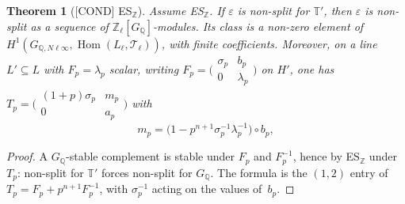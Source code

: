 \documentclass[11pt]{article}
\newcommand{\Z}{\mathbb{Z}}
\newcommand{\Q}{\mathbb{Q}}
\newcommand{\PGCOND}{\textsf{\small[COND]}}
\newtheorem*{theorem*}{Theorem}
\newcommand{\Hom}{\operatorname{Hom}}
\newcommand{\smat}[4]{\bigl(\begin{smallmatrix}#1&#2\\#3&#4\end{smallmatrix}\bigr)}
\begin{document}
\begin{theorem*}[\PGCOND{} ES$_{\Z}$] Assume \textup{ES$_{\Z}$}. If $\varepsilon$ is non-split for $\mathbb T'$, then $\varepsilon$ is non-split as a sequence of $\Z_\ell[G_\Q]$-modules. Its class is a non-zero element of $H^{1}(G_{\Q,N\ell\infty},\Hom(L_\ell,\mathcal T_\ell))$, with finite coefficients. Moreover, on a line $L'\subseteq L$ with $F_p=\lambda_p$ scalar, writing $F_p=\smat{\sigma_p}{b_p}{0}{\lambda_p}$ on $H'$, one has $T_p=\smat{(1+p)\sigma_p}{m_p}{0}{a_p}$ with
\[ m_p=\bigl(1-p^{n+1}\sigma_p^{-1}\lambda_p^{-1}\bigr)\circ b_p, \]
\end{theorem*}
\begin{proof} A $G_\Q$-stable complement is stable under $F_p$ and $F_p^{-1}$, hence by ES$_{\Z}$ under $T_p$: non-split for $\mathbb T'$ forces non-split for $G_\Q$. The formula is the $(1,2)$ entry of $T_p=F_p+p^{n+1}F_p^{-1}$, with $\sigma_p^{-1}$ acting on the values of~$b_p$.\end{proof}
\end{document}
